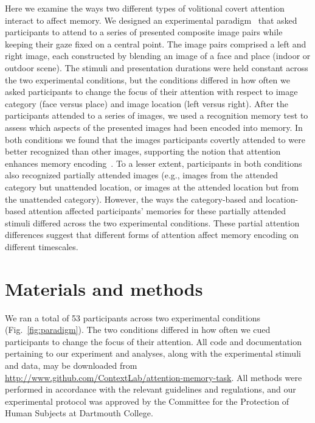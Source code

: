 \documentclass[english]{article}
\begin{document}
Here we examine the ways two different types of volitional covert attention
interact to affect memory. We designed an experimental
paradigm~\citep[following][]{Posn80} that asked participants to attend to a
series of presented composite image pairs while keeping their gaze fixed on a
central point. The image pairs comprised a left and right image, each
constructed by blending an image of a face and place (indoor or outdoor scene).
The stimuli and presentation durations were held constant across the two
experimental conditions, but the conditions differed in how often we asked
participants to change the focus of their attention with respect to image
category (face versus place) and image location (left versus right). After the
participants attended to a series of images, we used a recognition memory test
to assess which aspects of the presented images had been encoded into memory.
In both conditions we found that the images participants covertly attended to
were better recognized than other images, supporting the notion that attention
enhances memory encoding~\citep[i.e., they rated attended images as more
familiar than unattended images;][]{Yone02}. To a lesser extent, participants
in both conditions also recognized partially attended images (e.g., images from
the attended category but unattended location, or images at the attended
location but from the unattended category). However, the ways the
category-based and location-based attention affected participants' memories for
these partially attended stimuli differed across the two experimental conditions.
These partial attention differences suggest that different forms of attention
affect memory encoding on different timescales.

\section*{Materials and methods}

We ran a total of 53 participants across two experimental conditions
(Fig.~\ref{fig:paradigm}). The two conditions differed in how often we cued
participants to change the focus of their attention. All code and documentation
pertaining to our experiment and analyses, along with the experimental stimuli
and data, may be downloaded from
\url{http://www.github.com/ContextLab/attention-memory-task}. All methods were
performed in accordance with the relevant guidelines and regulations, and our
experimental protocol was approved by the Committee for the Protection of Human
Subjects at Dartmouth College.
\end{document}
